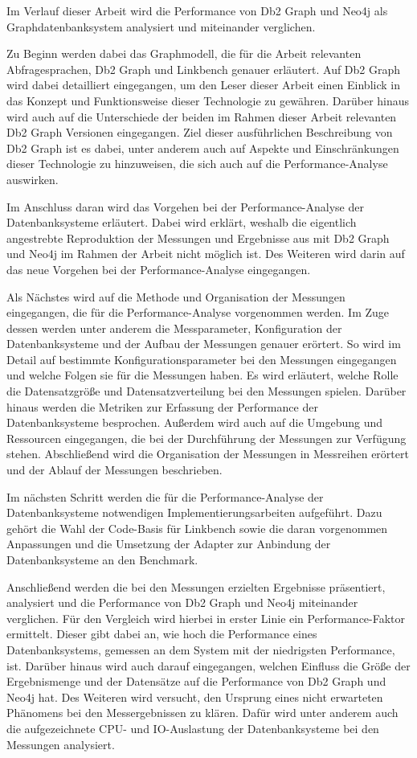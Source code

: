 Im Verlauf dieser Arbeit wird die Performance von Db2 Graph und Neo4j als Graphdatenbanksystem analysiert und miteinander verglichen. 

Zu Beginn werden dabei das Graphmodell, die für die Arbeit relevanten Abfragesprachen, Db2 Graph und Linkbench genauer erläutert. Auf Db2 Graph wird dabei detailliert eingegangen, um den Leser dieser Arbeit einen Einblick in das Konzept und Funktionsweise dieser Technologie zu gewähren. Darüber hinaus wird auch auf die Unterschiede der beiden im Rahmen dieser Arbeit relevanten Db2 Graph Versionen eingegangen. Ziel dieser ausführlichen Beschreibung von Db2 Graph ist es dabei, unter anderem auch auf Aspekte und Einschränkungen dieser Technologie zu hinzuweisen, die sich auch auf die Performance-Analyse auswirken.

Im Anschluss daran wird das Vorgehen bei der Performance-Analyse der Datenbanksysteme erläutert. Dabei wird erklärt, weshalb die eigentlich angestrebte Reproduktion der Messungen und Ergebnisse aus \cite{sigmod_tian} mit Db2 Graph und Neo4j im Rahmen der Arbeit nicht möglich ist. Des Weiteren wird darin auf das neue Vorgehen bei der Performance-Analyse eingegangen. 

Als Nächstes wird auf die Methode und Organisation der Messungen eingegangen, die für die Performance-Analyse vorgenommen werden. Im Zuge dessen werden unter anderem die Messparameter, Konfiguration der Datenbanksysteme und der Aufbau der Messungen genauer erörtert. So wird im Detail auf bestimmte Konfigurationsparameter bei den Messungen eingegangen und welche Folgen sie für die Messungen haben. Es wird erläutert, welche Rolle die Datensatzgröße und Datensatzverteilung bei den Messungen spielen. Darüber hinaus werden die Metriken zur Erfassung der Performance der Datenbanksysteme besprochen. Außerdem wird auch auf die Umgebung und Ressourcen eingegangen, die bei der Durchführung der Messungen zur Verfügung stehen. Abschließend wird die Organisation der Messungen in Messreihen erörtert und der Ablauf der Messungen beschrieben.  

Im nächsten Schritt werden die für die Performance-Analyse der Datenbanksysteme notwendigen Implementierungsarbeiten aufgeführt. Dazu gehört die Wahl der Code-Basis für Linkbench sowie die daran vorgenommen Anpassungen und die Umsetzung der Adapter zur Anbindung der Datenbanksysteme an den Benchmark. 

Anschließend werden die bei den Messungen erzielten Ergebnisse präsentiert, analysiert und die Performance von Db2 Graph und Neo4j miteinander verglichen. Für den Vergleich wird hierbei in erster Linie ein Performance-Faktor ermittelt. Dieser gibt dabei an, wie hoch die Performance eines Datenbanksystems, gemessen an dem System mit der niedrigsten Performance, ist. Darüber hinaus wird auch darauf eingegangen, welchen Einfluss die Größe der Ergebnismenge und der Datensätze auf die Performance von Db2 Graph und Neo4j hat. Des Weiteren wird versucht, den Ursprung eines nicht erwarteten Phänomens bei den Messergebnissen zu klären. Dafür wird unter anderem auch die aufgezeichnete CPU- und IO-Auslastung der Datenbanksysteme bei den Messungen analysiert.